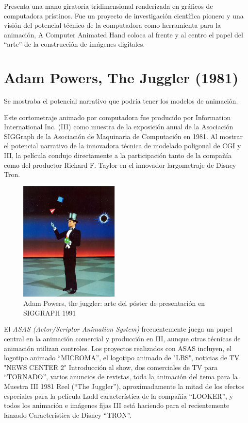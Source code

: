 \documentclass[a4paper,12pt]{report}
\begin{document}
 
Presenta una mano giratoria tridimensional renderizada en gráficos de computadora prístinos. 
Fue un proyecto de investigación científica pionero y
una visión del potencial técnico de la computadora como herramienta para la animación, 
A Computer Animated Hand coloca al frente y al centro el papel del ``arte'' de la construcción 
de imágenes digitales.\cite{animated_hand2}
 
 
\section{Adam Powers, The Juggler (1981)}
 
Se mostraba el potencial narrativo que podría tener los modelos de animación.
 
Este cortometraje animado por computadora fue producido por 
Information International Inc. (III) como muestra de la exposición anual 
de la Asociación SIGGraph de la Asociación de Maquinaria de 
Computación en 1981. Al mostrar el potencial narrativo
de la innovadora técnica de modelado poligonal de CGI y III,
la película condujo directamente a la participación 
tanto de la compañía como del productor Richard F. Taylor 
en el innovador largometraje de Disney Tron.\cite{the_juggler}
 
\newpage
 
\begin{figure}[ht]
    \centering
    \includegraphics[height=6cm]{Imagenes/adam_powers_the_juggler}
    \caption{Adam Powers, the juggler: arte del póster de presentación en SIGGRAPH 1991}
    \label{fig:adam_powers_the_juggler}
\end{figure}
 
 
El \textit{ASAS (Actor/Scriptor Animation System)} frecuentemente juega un papel
central en la animación comercial y producción en III, aunque otras técnicas de animación
utilizan controles. Los proyectos realizados con ASAS incluyen, el logotipo animado ``MICROMA'',
el logotipo animado de "LBS", noticias de TV "NEWS CENTER 2"
Introducción al show, dos comerciales de TV para ``TORNADO'', varios
anuncios de revistas, toda la animación del tema para la Muestra III 1981
Reel (``The Juggler''), aproximadamente la mitad de los efectos especiales para la película Ladd
característica de la compañía ``LOOKER'', y todos los
animación e imágenes fijas III está haciendo para el recientemente lanzado
Característica de Disney ``TRON''.\cite{asas_tron}
 
\end{document}
